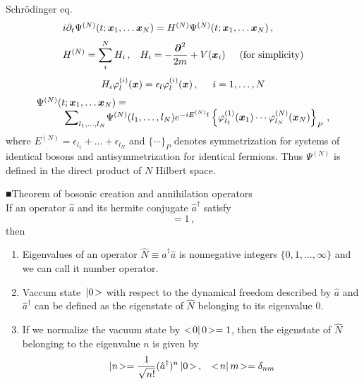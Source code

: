 Schr\"odinger eq.
\begin{equation}
\begin{array}{l}
i \partial_t
\Psi^{(N)}(t; \bld{x}_1, \dots \bld{x}_N) = H^{(N)} \Psi^{(N)}(t; \bld{x}_1, \dots \bld{x}_N)\,,
\vspace{2mm}
\\
\displaystyle
H^{(N)} = \sum_i^N H_i\,,
\hspace{3mm}
H_i = - \frac{\bld{\partial}^2}{2m} + V(\bld{x}_i)
\hspace{5mm}
\mbox{(for simplicity)}
\end{array}
\end{equation}
\begin{equation}
H_i \varphi_l^{(i)} (\mbox{\boldmath $x$} ) = \epsilon_l \varphi_l^{(i)} (\mbox{\boldmath $x$} )\,,
\hspace{5mm}
i = 1, \dots, N
\end{equation}
\begin{equation}
\begin{array}{l}
\Psi^{(N)}(t; \bld{x}_1, \dots \bld{x}_N)
=
\hspace{50mm}
\\
\hspace{10mm}
{\mathop{\displaystyle \sum}_{\scriptstyle  l_1, \dots, l_N} }
\Psi^{(N)}(l_1,\dots, l_N)
e^{-i E^{(N)} t}
\left\{
\varphi_{l_1}^{(1)} (\bld{x}_1 ) \cdots \varphi_{l_N}^{(N)} (\bld{x}_N )
\right\}_P\,,
\end{array}
\end{equation}
where $E^{(N)} = \epsilon_{l_1} + \dots + \epsilon_{l_N}$ and
$\{\cdots \}_P$ denotes symmetrization  for systems of identical bosons
and antisymmetrization for identical fermions.
Thus $\Psi^{(N)}$ is defined in the direct product of $N$ Hilbert space.

\bigskip
\noindent
■Theorem of bosonic creation and annihilation operators\\
If an operator $\hat{a}$ and its hermite conjugate $\hat{a}^\dagger$ satisfy
\begin{equation}
[\hat{a}, \hat{a}^\dagger] = 1\,,
\end{equation}
then
\begin{enumerate}
\item Eigenvalues of an operator $\hat{N} \equiv \hat{a}^\dagger \hat{a}$ is
nonnegative integers $\{0,1,\dots,\infty\}$ and we can call it number operator.
\item Vaccum state $\,| 0 \!>$ with respect to the dynamical freedom described by $\hat{a}$
and $\hat{a}^\dagger$ can be defined as the eigenstate of
$\hat{N}$ belonging to its eigenvalue 0.
\item
If we normalize the vacuum state by $<\! 0 |\, 0 \!> = 1$, then the eigenstate
of $\hat{N}$ belonging to the eigenvalue $n$ is given by
\begin{equation}
\,| n \!> = \frac{1}{\sqrt{n!}} (\hat{a}^\dagger )^n \,|  0 \!> \,,
\hspace{3mm}
<\! n |\, m \!> = \delta_{nm}
\end{equation}
\end{enumerate}

